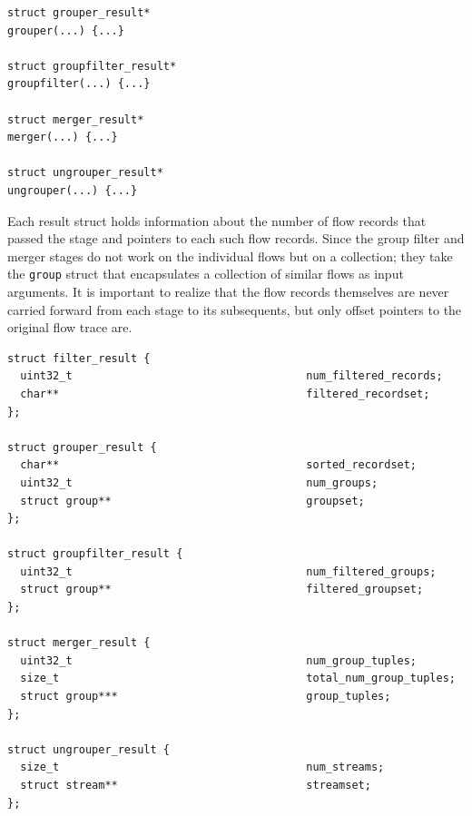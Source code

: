 \begin{lstlisting}
struct grouper_result*
grouper(...) {...}

struct groupfilter_result*
groupfilter(...) {...}

struct merger_result*
merger(...) {...}

struct ungrouper_result*
ungrouper(...) {...}
\end{lstlisting}

Each result struct holds information about the number of flow records that
passed the stage and pointers to each such flow records. Since the group
filter and merger stages do not work on the individual flows but on a
collection; they take  the \texttt{group} struct
that encapsulates a collection of similar flows as input arguments. It is
important to realize that the flow records themselves are never carried
forward from each stage to its subsequents, but only offset pointers to the
original flow trace are.

\begin{lstlisting}
struct filter_result {
  uint32_t                                    num_filtered_records;
  char**                                      filtered_recordset;
};

struct grouper_result {
  char**                                      sorted_recordset;
  uint32_t                                    num_groups;
  struct group**                              groupset;
};

struct groupfilter_result {
  uint32_t                                    num_filtered_groups;
  struct group**                              filtered_groupset;
};

struct merger_result {
  uint32_t                                    num_group_tuples;
  size_t                                      total_num_group_tuples;
  struct group***                             group_tuples;
};

struct ungrouper_result {
  size_t                                      num_streams;
  struct stream**                             streamset;
};
\end{lstlisting}


